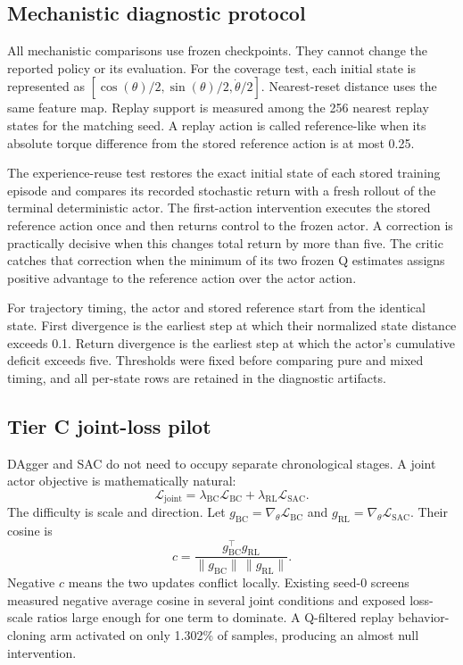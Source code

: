\documentclass[10pt,twocolumn]{article}
\begin{document}
\subsection{Mechanistic diagnostic protocol}

All mechanistic comparisons use frozen checkpoints. They cannot change the reported policy or its evaluation. For the coverage test, each initial state is represented as
$[\cos(\theta)/2,\sin(\theta)/2,\dot{\theta}/2]$.
Nearest-reset distance uses the same feature map. Replay support is measured among the 256 nearest replay states for the matching seed. A replay action is called reference-like when its absolute torque difference from the stored reference action is at most 0.25.

The experience-reuse test restores the exact initial state of each stored training episode and compares its recorded stochastic return with a fresh rollout of the terminal deterministic actor. The first-action intervention executes the stored reference action once and then returns control to the frozen actor. A correction is practically decisive when this changes total return by more than five. The critic catches that correction when the minimum of its two frozen Q estimates assigns positive advantage to the reference action over the actor action.

For trajectory timing, the actor and stored reference start from the identical state. First divergence is the earliest step at which their normalized state distance exceeds 0.1. Return divergence is the earliest step at which the actor's cumulative deficit exceeds five. Thresholds were fixed before comparing pure and mixed timing, and all per-state rows are retained in the diagnostic artifacts.

\subsection{Tier C joint-loss pilot}

DAgger and SAC do not need to occupy separate chronological stages. A joint actor objective is mathematically natural:
\[
\mathcal{L}_{\mathrm{joint}}=
\lambda_{\mathrm{BC}}\mathcal{L}_{\mathrm{BC}}+
\lambda_{\mathrm{RL}}\mathcal{L}_{\mathrm{SAC}}.
\]
The difficulty is scale and direction. Let $g_{\mathrm{BC}}=\nabla_\theta\mathcal{L}_{\mathrm{BC}}$ and $g_{\mathrm{RL}}=\nabla_\theta\mathcal{L}_{\mathrm{SAC}}$. Their cosine is
\[
c=\frac{g_{\mathrm{BC}}^\top g_{\mathrm{RL}}}
{\|g_{\mathrm{BC}}\|\,\|g_{\mathrm{RL}}\|}.
\]
Negative $c$ means the two updates conflict locally. Existing seed-0 screens measured negative average cosine in several joint conditions and exposed loss-scale ratios large enough for one term to dominate. A Q-filtered replay behavior-cloning arm activated on only 1.302\% of samples, producing an almost null intervention.
\end{document}

